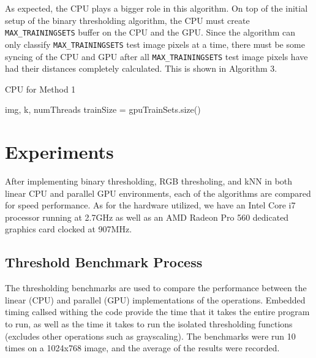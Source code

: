 \documentclass[conference]{IEEEtran}
\begin{document}
As expected, the CPU plays a bigger role in this algorithm. On top of the initial setup of the binary thresholding algorithm, the CPU must create \verb|MAX_TRAININGSETS| buffer on the CPU and the GPU. Since the algorithm can only classify \verb|MAX_TRAININGSETS| test image pixels at a time, there must be some syncing of the CPU and GPU after all \verb|MAX_TRAININGSETS| test image pixels have had their distances completely calculated. This is shown in Algorithm 3.

\begin{algorithm}[H]
\caption{CPU for Method 1}
\begin{algorithmic}[1]
\renewcommand{\algorithmicrequire}{\textbf{Input:}}
\REQUIRE img, k, numThreads
\STATE trainSize = gpuTrainSets.size()
\ENDFOR

\end{algorithmic}
\end{algorithm}

\section{Experiments}
After implementing binary thresholding, RGB thresholing, and kNN in both linear CPU and parallel GPU environments, each of the algorithms are compared for speed performance. As for the hardware utilized, we have an Intel Core i7 processor running at 2.7GHz as well as an AMD Radeon Pro 560 dedicated graphics card clocked at 907MHz.

\subsection{Threshold Benchmark Process}
The thresholding benchmarks are used to compare the performance between the linear (CPU) and parallel (GPU) implementations of the operations. Embedded timing callsed withing the code provide the time that it takes the entire program to run, as well as the time it takes to run the isolated thresholding functions (excludes other operations such as grayscaling). The benchmarks were run 10 times on a 1024x768 image, and the average of the results were recorded.
\end{document}
